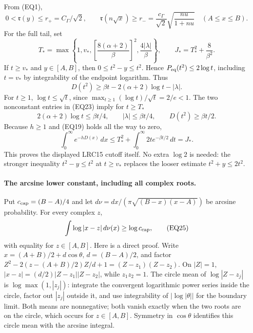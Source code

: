 From (EQ1),
\[
 0<{\mathfrak r}(y)\le r_+=C_\Gamma/\sqrt2,\qquad
 {\mathfrak r}(n\sqrt x)\ge r_-=
 \frac{c_\Gamma}{\sqrt2}\sqrt{\frac{nu}{1+nu}}
 \quad(A\le x\le B).
\tag{EQ22}
\]
For the full tail, set
\[
 T_*=\max\left\{1,v_*,
 \left[\frac{8(\alpha+2)}{\beta}\right]^2,
 \frac{4|\lambda|}{\beta}\right\},\qquad
 J_*=T_*^2+\frac8{\beta^2}.
\tag{EQ23}
\]
If \(t\ge v_*\) and \(y\in[A,B]\), then
\(0\le t^2-y\le t^2\).  Hence \(P_{\rm eq}(t^2)\le2\log t\),
including \(t=v_*\) by integrability of the endpoint logarithm.
Thus
\[
 D(t^2)\ge\beta t-2(\alpha+2)\log t-|\lambda|.
\]
For \(t\ge1\), \(\log t\le\sqrt t\), since
\(\max_{t\ge1}(\log t)/\sqrt t=2/e<1\).
The two nonconstant entries in (EQ23) imply for \(t\ge T_*\)
\[
 2(\alpha+2)\log t\le\beta t/4,\qquad
 |\lambda|\le\beta t/4,\qquad D(t^2)\ge\beta t/2 .
\]
Because \(h\ge1\) and (EQ19) holds all the way to zero,
\[
 \int_0^\infty e^{-hD(x)}\,dx
 \le T_*^2+\int_0^\infty2t e^{-\beta t/2}\,dt
 =J_* .
\tag{EQ24}
\]
This proves the displayed LRC15 cutoff itself.  No extra \(\log2\) is
needed: the stronger inequality \(t^2-y\le t^2\) at \(t\ge v_*\)
replaces the looser estimate \(t^2+y\le2t^2\).

\paragraph{The arcsine lower constant, including all complex roots.}
Put \(c_{\rm cap}=(B-A)/4\) and let
\(d\nu=dx/(\pi\sqrt{(B-x)(x-A)})\) be arcsine probability.
For every complex \(z\),
\[
 \int\log|x-z|\,d\nu(x)\ge\log c_{\rm cap},
\tag{EQ25}
\]
with equality for \(z\in[A,B]\).
Here is a direct proof.  Write \(x=(A+B)/2+d\cos\theta\),
\(d=(B-A)/2\), and factor
\(Z^2-2(z-(A+B)/2)Z/d+1=(Z-z_1)(Z-z_2)\).
On \(|Z|=1\),
\(|x-z|=(d/2)|Z-z_1||Z-z_2|\), while \(z_1z_2=1\).
The circle mean of \(\log|Z-z_j|\) is
\(\log\max(1,|z_j|)\): integrate the convergent logarithmic power
series inside the circle, factor out \(|z_j|\) outside it, and use
integrability of \(|\log|\theta||\) for the boundary limit.
Both means are nonnegative; both vanish exactly when the two roots
are on the circle, which occurs for \(z\in[A,B]\).  Symmetry in
\(\cos\theta\) identifies this circle mean with the arcsine integral.

